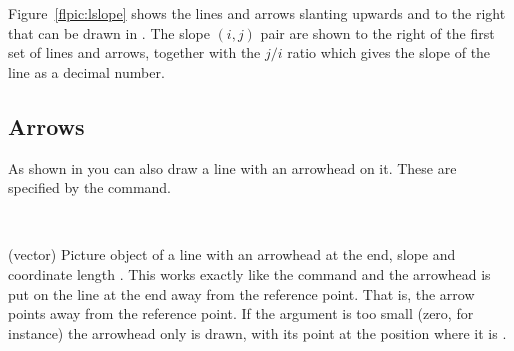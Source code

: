     Figure~\ref{flpic:lslope} shows the lines and arrows slanting
upwards and to the right that can be drawn in \ltx. The slope $(i,j)$
pair are shown to the right of the first set of lines and arrows, together
with the $j/i$ ratio which gives the slope of the line as a decimal number.


\subsection{Arrows}

    As shown in  you can also draw a line with an 
arrowhead 
on it. These are specified 
by the \cmd{\vector}
command.
\begin{syntax}
\cmd{\vector} \\
\end{syntax}
\glossary(vector)
{}{Picture object of a line with an
arrowhead at the end, slope    and coordinate 
length .}
 This works exactly
like the \cmd{\line} command and the arrowhead is put on the line at the
end away from the reference point. 
That is, the arrow points away from the
reference point. If the  argument is too small (zero,
for instance) the arrowhead only is drawn, with its point at the position
where it is \cmd{\put}.

